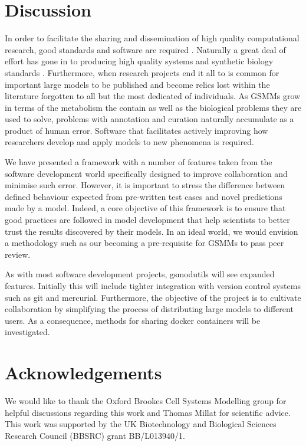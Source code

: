 \documentclass[a4paper,10pt]{article}
\begin{document}
\section{Discussion}
In order to facilitate the sharing and dissemination of high quality computational research, good standards and software are required \cite{jimenez2017four}.
Naturally a great deal of effort has gone in to producing high quality systems and synthetic biology standards \cite{hucka2003systems, cox2018synthetic}.
Furthermore, when research projects end it all to is common for important large models to be published and become relics lost within the literature forgotten to all but the most dedicated of individuals.
As GSMMs grow in terms of the metabolism the contain as well as the biological problems they are used to solve, problems with annotation and curation naturally accumulate as a product of human error.
Software that facilitates actively improving how researchers develop and apply models to new phenomena is required.

We have presented a framework with a number of features taken from the software development world specifically designed to improve collaboration and minimise such error.
However, it is important to stress the difference between defined behaviour expected from pre-written test cases and novel predictions made by a model.
Indeed, a core objective of this framework is to ensure that good practices are followed in model development that help scientists to better trust the results discovered by their models.
In an ideal world, we would envision a methodology such as our becoming a pre-requisite for GSMMs to pass peer review.

As with most software development projects, gsmodutils will see expanded features.
Initially this will include tighter integration with version control systems such as git and mercurial.
Furthermore, the objective of the project is to cultivate collaboration by simplifying the process of distributing large models to different users.
As a consequence, methods for sharing docker containers will be investigated.

\section*{Acknowledgements}
We would like to thank the Oxford Brookes Cell Systems Modelling group for helpful discussions regarding this work and Thomas Millat for scientific advice.
This work was supported by the UK Biotechnology and Biological Sciences Research Council (BBSRC) grant BB/L013940/1.




\end{document}

